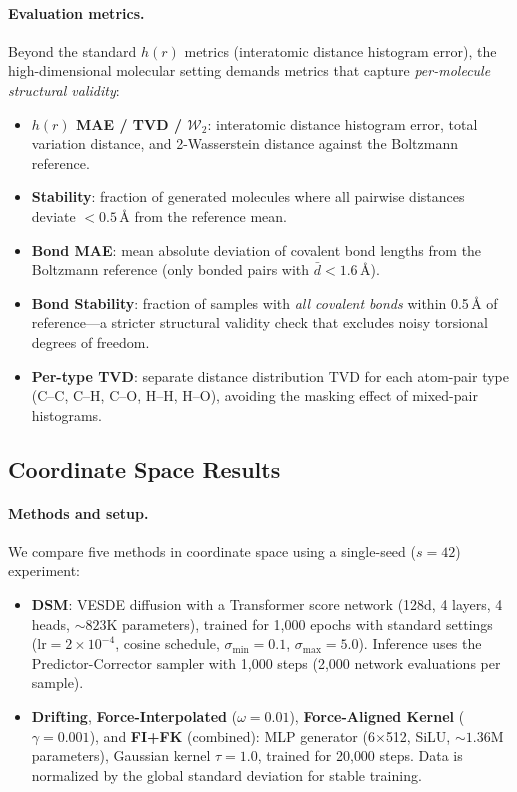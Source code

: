 \documentclass[11pt]{article}
\begin{document}
\paragraph{Evaluation metrics.}
Beyond the standard $h(r)$ metrics (interatomic distance histogram error), the high-dimensional molecular setting demands metrics that capture \emph{per-molecule structural validity}:
\begin{itemize}
    \item \textbf{$h(r)$ MAE / TVD / $\mathcal{W}_2$}: interatomic distance histogram error, total variation distance, and 2-Wasserstein distance against the Boltzmann reference.
    \item \textbf{Stability}: fraction of generated molecules where all pairwise distances deviate $< 0.5$\,\AA{} from the reference mean.
    \item \textbf{Bond MAE}: mean absolute deviation of covalent bond lengths from the Boltzmann reference (only bonded pairs with $\bar{d} < 1.6$\,\AA).
    \item \textbf{Bond Stability}: fraction of samples with \emph{all covalent bonds} within 0.5\,\AA{} of reference---a stricter structural validity check that excludes noisy torsional degrees of freedom.
    \item \textbf{Per-type TVD}: separate distance distribution TVD for each atom-pair type (C--C, C--H, C--O, H--H, H--O), avoiding the masking effect of mixed-pair histograms.
\end{itemize}

\subsection{Coordinate Space Results}
\label{sec:coordinate-results}

\paragraph{Methods and setup.}
We compare five methods in coordinate space using a single-seed ($s{=}42$) experiment:
\begin{itemize}
    \item \textbf{DSM}: VESDE diffusion with a Transformer score network (128d, 4 layers, 4 heads, ${\sim}823$K parameters), trained for 1{,}000 epochs with standard settings (lr${}=2{\times}10^{-4}$, cosine schedule, $\sigma_{\min}{=}0.1$, $\sigma_{\max}{=}5.0$). Inference uses the Predictor-Corrector sampler with 1{,}000 steps (2{,}000 network evaluations per sample).
    \item \textbf{Drifting}, \textbf{Force-Interpolated} ($\omega{=}0.01$), \textbf{Force-Aligned Kernel} ($\gamma{=}0.001$), and \textbf{FI+FK} (combined): MLP generator (6$\times$512, SiLU, ${\sim}1.36$M parameters), Gaussian kernel $\tau{=}1.0$, trained for 20{,}000 steps. Data is normalized by the global standard deviation for stable training.
\end{itemize}
\end{document}
